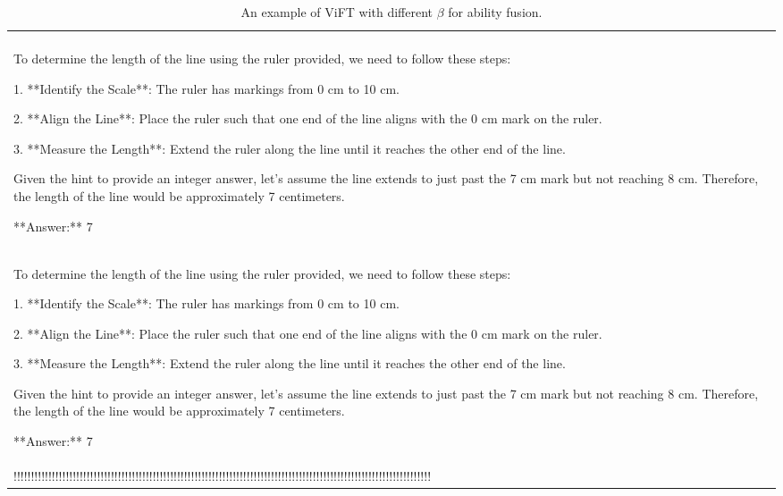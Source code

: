 \begin{table*}[htbp]
\begin{tabular}{p{14cm}}
        \begin{tcolorbox}[colback=gray!5, colframe=gray!40, sharp corners, width=\linewidth, boxrule=0.5mm]
        \small
        \textbf{$\beta=0.2$:}
        \\
To determine the length of the line using the ruler provided, we need to follow these steps:

1. **Identify the Scale**: The ruler has markings from 0 cm to 10 cm.

2. **Align the Line**: Place the ruler such that one end of the line aligns with the 0 cm mark on the ruler.

3. **Measure the Length**: Extend the ruler along the line until it reaches the other end of the line.

Given the hint to provide an integer answer, let's assume the line extends to just past the 7 cm mark but not reaching 8 cm. Therefore, the length of the line would be approximately 7 centimeters.

**Answer:** 7


\end{tcolorbox}

        \begin{tcolorbox}[colback=gray!5, colframe=gray!40, sharp corners, width=\linewidth, boxrule=0.5mm]
        \small
        \textbf{$\beta=0.3$:}
        \\
To determine the length of the line using the ruler provided, we need to follow these steps:

1. **Identify the Scale**: The ruler has markings from 0 cm to 10 cm.

2. **Align the Line**: Place the ruler such that one end of the line aligns with the 0 cm mark on the ruler.

3. **Measure the Length**: Extend the ruler along the line until it reaches the other end of the line.

Given the hint to provide an integer answer, let's assume the line extends to just past the 7 cm mark but not reaching 8 cm. Therefore, the length of the line would be approximately 7 centimeters.

**Answer:** 7


\end{tcolorbox}

        \begin{tcolorbox}[colback=gray!5, colframe=gray!40, sharp corners, width=\linewidth, boxrule=0.5mm]
        \small
        \textbf{$\beta=0.4$:}
        \\
!!!!!!!!!!!!!!!!!!!!!!!!!!!!!!!!!!!!!!!!!!!!!!!!!!!!!!!!!!!!!!!!!!!!!!!!!!!!!!!!!!!!!!!!!!!!!!!!!!!!!!!!!!!!!!!!!!!!!!!!


\end{tcolorbox}
\end{tabular}
\caption{An example of ViFT with different $\beta$ for ability fusion.}
\label{tab:case3}
\end{table*}











